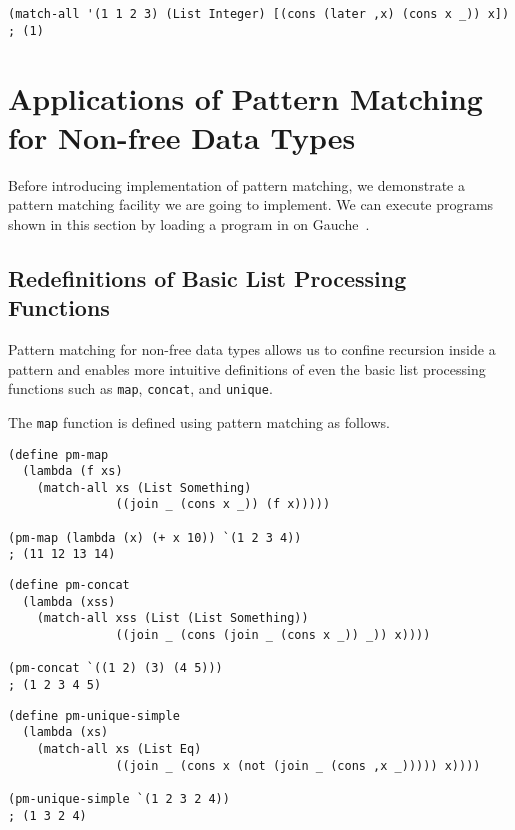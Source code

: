 \documentclass[acmlarge]{acmart}
\begin{document}
\begin{lstlisting}[language=egison]
(match-all '(1 1 2 3) (List Integer) [(cons (later ,x) (cons x _)) x]) ; (1)
\end{lstlisting}


\section{Applications of Pattern Matching for Non-free Data Types}

Before introducing implementation of pattern matching, we demonstrate a pattern matching facility we are going to implement.
We can execute programs shown in this section by loading a program in \cite{egisonScheme} on Gauche~\cite{gaucheWeb}.

\subsection{Redefinitions of Basic List Processing Functions}

Pattern matching for non-free data types allows us to confine recursion inside a pattern and enables more intuitive definitions of even the basic list processing functions such as \texttt{map}, \texttt{concat}, and \texttt{unique}.

The \texttt{map} function is defined using pattern matching as follows.

\begin{lstlisting}[language=egison]
(define pm-map
  (lambda (f xs)
    (match-all xs (List Something)
               ((join _ (cons x _)) (f x)))))

(pm-map (lambda (x) (+ x 10)) `(1 2 3 4))
; (11 12 13 14)
\end{lstlisting}

\begin{lstlisting}[language=egison]
(define pm-concat
  (lambda (xss)
    (match-all xss (List (List Something))
               ((join _ (cons (join _ (cons x _)) _)) x))))

(pm-concat `((1 2) (3) (4 5)))
; (1 2 3 4 5)
\end{lstlisting}


\begin{lstlisting}[language=egison]
(define pm-unique-simple
  (lambda (xs)
    (match-all xs (List Eq)
               ((join _ (cons x (not (join _ (cons ,x _))))) x))))

(pm-unique-simple `(1 2 3 2 4))
; (1 3 2 4)
\end{lstlisting}
\end{document}
